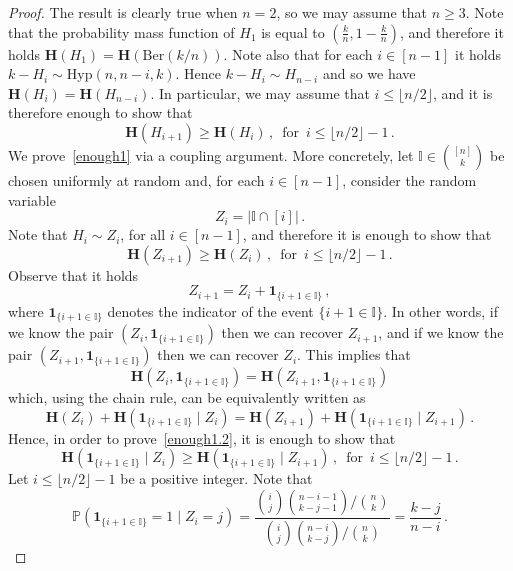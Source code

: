 \documentclass[10pt,a4paper]{amsart}
\newcommand{\Prb}{\mathbb{P}}
\newcommand{\bh}{\mathbf{H}}
\begin{document}
\begin{proof} 
The result is clearly true when $n=2$, so we may assume that $n\ge 3$. 
Note that the probability mass function of $H_1$ is equal to $(\frac{k}{n}, 1 - \frac{k}{n})$, and therefore it holds 
$\bh(H_1)=\bh(\text{Ber}(k/n))$. 
Note also that  for each $i\in [n-1]$ it holds 
$k-H_i \sim\text{Hyp}(n,n-i,k)$. Hence $k-H_i \sim H_{n-i}$ and so we have $\bh(H_i) = \bh(H_{n-i})$. 
In particular, we may assume that $i\le \lfloor n/2\rfloor$, and it  is therefore  enough to show that 
\begin{equation}\label{enough1}
\bh(H_{i+1}) \ge \bh(H_i) \, , \, \text{ for } \, i \le \lfloor n/2\rfloor -1 \, .
\end{equation}
We prove~\eqref{enough1} via a coupling argument.  
More concretely, let $\mathbb{I}\in\binom{[n]}{k}$ be chosen uniformly at random and, for each $i\in [n-1]$, consider the random variable  
\[
Z_i = |\mathbb{I} \cap [i]| \, .
\]   
Note that $H_i \sim Z_i$, for all $i\in [n-1]$, and therefore it is enough to show that 
\begin{equation}\label{enough1.2}
\bh(Z_{i+1}) \ge \bh(Z_i) \, , \, \text{ for } \, i \le \lfloor n/2\rfloor -1 \, .
\end{equation}
Observe that it holds 
\[
Z_{i+1} = Z_i + \mathbf{1}_{\{i+1\in \mathbb{I}\}} \, ,
\]
where $\mathbf{1}_{\{i+1\in \mathbb{I}\}}$ denotes the indicator of the event $\{i+1\in \mathbb{I}\}$. 
In other words, if we know the pair $(Z_i, \mathbf{1}_{\{i+1\in \mathbb{I}\}})$ then we can recover $Z_{i+1}$, and if we know the pair 
$(Z_{i+1}, \mathbf{1}_{\{i+1\in \mathbb{I}\}})$ then we can recover $Z_i$. 
This implies that 
\[
\bh(Z_i, \mathbf{1}_{\{i+1\in \mathbb{I}\}}) = \bh(Z_{i+1}, \mathbf{1}_{\{i+1\in \mathbb{I}\}}) 
\]
which, using the chain rule, can be equivalently written as 
\[
\bh(Z_i) + \bh(\mathbf{1}_{\{i+1\in \mathbb{I}\}}\mid Z_i) = 
\bh(Z_{i+1}) + \bh(\mathbf{1}_{\{i+1\in \mathbb{I}\}}\mid Z_{i+1}) \, .
\]
Hence, in order to prove~\eqref{enough1.2}, it is enough to show that 
\begin{equation}\label{enough2}
\bh(\mathbf{1}_{\{i+1\in \mathbb{I}\}}\mid Z_i) \ge \bh(\mathbf{1}_{\{i+1\in \mathbb{I}\}}\mid Z_{i+1}) \, , \, \text{ for } \, i \le \lfloor n/2\rfloor -1 \, .
\end{equation}
Let $i\le \lfloor n/2\rfloor -1$ be a positive integer. Note that 
\[
\Prb(\mathbf{1}_{\{i+1\in\mathbb{I}\}}=1 \mid Z_i = j)= \frac{\binom{i}{j}\binom{n-i-1}{k-j-1}/\binom{n}{k}}{\binom{i}{j}\binom{n-i}{k-j}/\binom{n}{k} }
= \frac{k-j}{n-i} \, .
\]
\end{proof}
\end{document}
